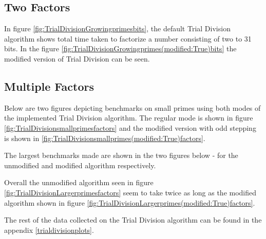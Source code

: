 \subsection{Two Factors}

In figure \ref{fig:TrialDivisionGrowingprimesbits}, the default Trial Division algorithm shows total time taken to factorize a number consisting of two to 31 bits. In the figure \ref{fig:TrialDivisionGrowingprimes(modified:True)bits} the modified version of Trial Division can be seen.





\subsection{Multiple Factors}\label{PollardsMultipleFactors}

Below are two figures depicting benchmarks on small primes using both modes of the implemented Trial Division algorithm. The regular mode is shown in figure \ref{fig:TrialDivisionsmallprimesfactors} and the modified version with odd stepping is shown in \ref{fig:TrialDivisionsmallprimes(modified:True)factors}.





The largest benchmarks made are shown in the two figures below - for the unmodified and modified algorithm respectively.





Overall the unmodified algorithm seen in figure \ref{fig:TrialDivisionLargerprimesfactors} seem to take twice as long as the modified algorithm shown in figure \ref{fig:TrialDivisionLargerprimes(modified:True)factors}.

The rest of the data collected on the Trial Division algorithm can be found in the appendix \ref{trialdivisionplots}.